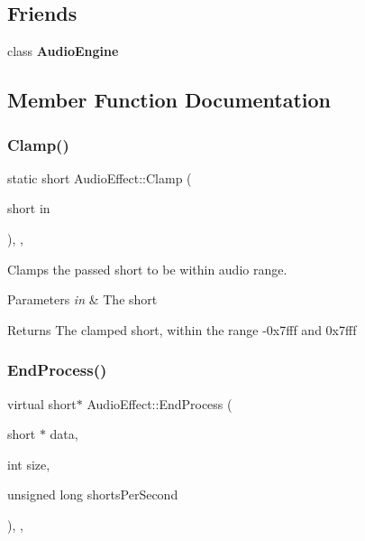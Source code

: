 \subsection*{Friends}
\begin{DoxyCompactItemize}
\item 
\mbox{\label{class_audio_effect_a234a96133b0b1dbaf4181626861f7c4a}} 
class {\bfseries Audio\+Engine}
\end{DoxyCompactItemize}


\subsection{Member Function Documentation}
\mbox{\label{class_audio_effect_a206794f66b9e0ca2cde69e970f3f398d}} 
\subsubsection{\texorpdfstring{Clamp()}{Clamp()}}
{\footnotesize\ttfamily static short Audio\+Effect\+::\+Clamp (\begin{DoxyParamCaption}\item[{short}]{in }\end{DoxyParamCaption})\hspace{0.3cm}{\ttfamily [inline]}, {\ttfamily [static]}, {\ttfamily [protected]}}



Clamps the passed short to be within audio range. 


\begin{DoxyParams}{Parameters}
{\em in} & The short \\
\hline
\end{DoxyParams}
\begin{DoxyReturn}{Returns}
The clamped short, within the range -\/0x7fff and 0x7fff 
\end{DoxyReturn}
\mbox{\label{class_audio_effect_aa281bd543b2841eeab97e7f23bed8889}} 
\subsubsection{\texorpdfstring{End\+Process()}{EndProcess()}}
{\footnotesize\ttfamily virtual short$\ast$ Audio\+Effect\+::\+End\+Process (\begin{DoxyParamCaption}\item[{short $\ast$}]{data,  }\item[{int}]{size,  }\item[{unsigned long}]{shorts\+Per\+Second }\end{DoxyParamCaption})\hspace{0.3cm}{\ttfamily [inline]}, {\ttfamily [protected]}, {\ttfamily [virtual]}}



